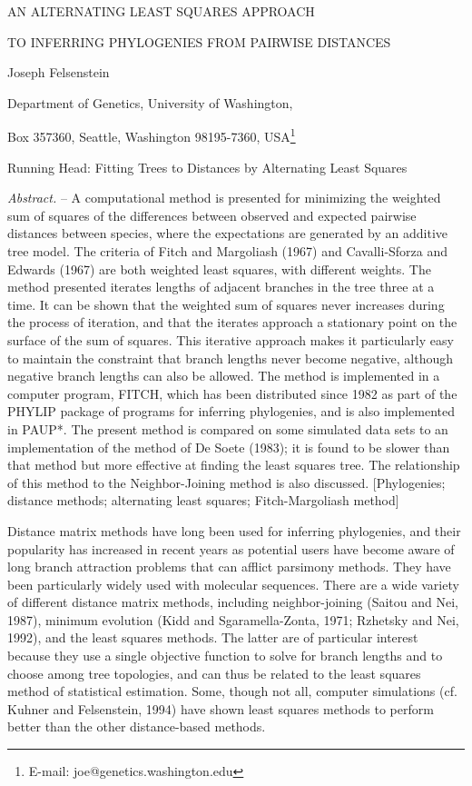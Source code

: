 \documentclass[12pt]{article}
\begin{document}
\centerline{AN ALTERNATING LEAST SQUARES APPROACH}
\medskip

\centerline{TO INFERRING PHYLOGENIES FROM PAIRWISE DISTANCES}
\bigskip

\centerline{Joseph Felsenstein}

\bigskip
\centerline{Department of Genetics, University of Washington,}
\medskip
\centerline{Box 357360, Seattle, Washington 98195-7360, USA\footnote[1]{E-mail: joe@genetics.washington.edu}}


\bigskip
\centerline{Running Head: Fitting Trees to Distances by Alternating Least Squares}

\newpage

{\it Abstract.} --  A computational method is presented for minimizing the weighted
sum of squares of the differences between observed and expected pairwise 
distances between species, where the expectations are generated by an
additive tree model.  The criteria of Fitch and Margoliash (1967) and
Cavalli-Sforza and Edwards (1967) are both weighted least squares, with
different weights.  The method presented iterates lengths of adjacent
branches in the tree
three at a time.  It can be shown that the weighted sum of squares never
increases during the process of iteration, and that the iterates approach a
stationary point on the surface of the sum of squares.  This iterative
approach makes it particularly easy to maintain the constraint that branch
lengths never become negative, although negative branch lengths can also be
allowed.  The method is implemented in a computer program, FITCH, which has 
been distributed since 1982 as part of the PHYLIP package of programs for inferring phylogenies, and is also implemented in PAUP*.
The present method is compared on some simulated data sets to an implementation
of the method of De Soete (1983); it is found to be slower than that method
but more effective at finding the least squares tree.  The relationship of
this method to the Neighbor-Joining method is also discussed.
[Phylogenies; distance methods; alternating least squares; Fitch-Margoliash method]


\newpage

Distance matrix methods have long been used for inferring phylogenies,
and their popularity has increased in recent years as potential users
have become aware of long branch attraction problems that can afflict
parsimony methods.  They have been particularly widely used with
molecular sequences.
There are a wide variety of different distance matrix methods, including
neighbor-joining (Saitou and Nei, 1987), minimum evolution (Kidd and
Sgaramella-Zonta, 1971; Rzhetsky and Nei, 1992), and the least squares
methods.  The latter are of particular interest because they use a
single objective function to solve for branch lengths and to choose among
tree topologies, and can thus be related to the least squares method of
statistical estimation.  Some, though not all, computer simulations (cf. Kuhner and Felsenstein,
1994) have shown least squares methods
to perform better than the other distance-based methods.
\end{document}
